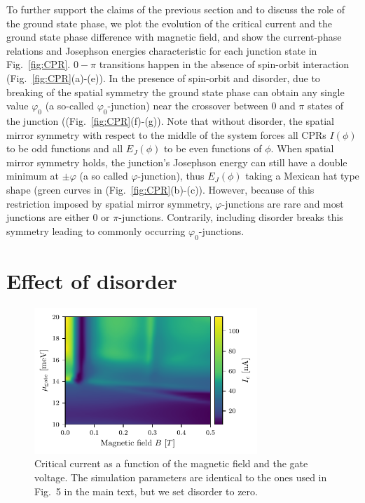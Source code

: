 \documentclass[english, aps,prb,showpacs,preprintnumber,amsmath,amssymb,superscriptaddress,reprint]{revtex4-1}
\begin{document}
To further support the claims of the previous section and to discuss the role of the ground state phase, we plot the evolution of the critical current and the ground state phase difference with magnetic field, and show the current-phase relations and Josephson energies characteristic for each junction state in Fig.~\ref{fig:CPR}.
$0-\pi$ transitions happen in the absence of spin-orbit interaction (Fig.~\ref{fig:CPR}(a)-(e)). 
In the presence of spin-orbit and disorder, due to breaking of the spatial symmetry the ground state phase can obtain any single value $\varphi_0$ (a so-called $\varphi_0$-junction) near the crossover between $0$ and $\pi$ states of the junction ((Fig.~\ref{fig:CPR}(f)-(g)).
Note that without disorder, the spatial mirror symmetry with respect to the middle of the system forces all CPRs $I(\phi)$ to be odd functions and all $E_J(\phi)$ to be even functions of $\phi$.
When spatial mirror symmetry holds, the junction's Josephson energy can still have a double minimum at $\pm\varphi$ (a so called $\varphi$-junction), thus $E_J(\phi)$ taking a Mexican hat type shape (green curves in (Fig.~\ref{fig:CPR}(b)-(c)).
However, because of this restriction imposed by spatial mirror symmetry, $\varphi$-junctions are rare and most junctions are either 0 or $\pi$-junctions.
Contrarily, including disorder breaks this symmetry leading to commonly occurring $\varphi_0$-junctions.

\section{Effect of disorder}

\begin{figure}[!h]
\centering
\includegraphics[width=0.75\textwidth]{figures/sup_fig9.pdf}
\caption{Critical current as a function of the magnetic field and the gate voltage. The simulation parameters are identical to the ones used in Fig.~5 in the main text, but we set disorder to zero.\label{fig:gate_dependence}}
\end{figure}
\end{document}
